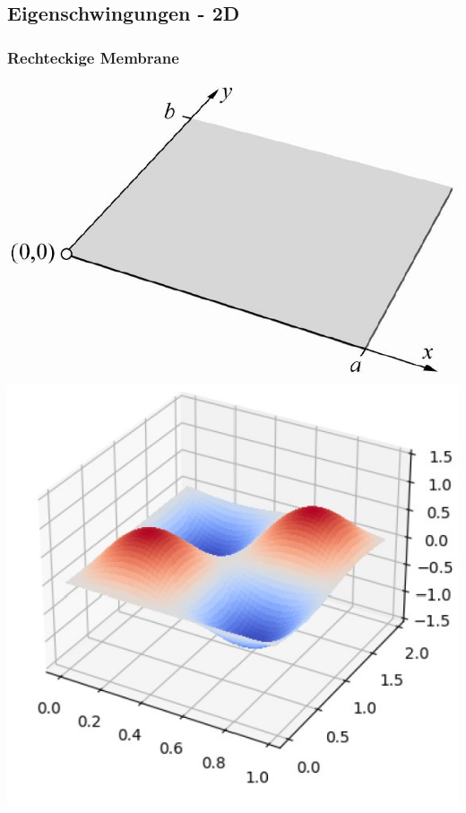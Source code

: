 \subsection{Eigenschwingungen - 2D}

\subsubsection{Rechteckige Membrane}


\begin{minipage}{0.3\linewidth}
	\includegraphics[width=0.98\linewidth]{Bilder/Wellen-Optik/membrane} \\
	\includegraphics[width=0.98\linewidth]{Bilder/Wellen-Optik/membrane-3d.jpg} \\
\end{minipage}
